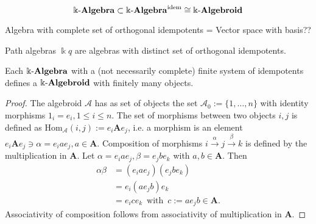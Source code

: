 \[
\Bbbk\textnormal{-}\mathbf{Algebra} \subset \Bbbk\textnormal{-}\mathbf{Algebra}^{\text{idem}} \cong \Bbbk\textnormal{-}\mathbf{Algebroid}
\]

Algebra with complete set of orthogonal idempotents = Vector space with basis??

Path algebras $\Bbbk q$ are algebras with distinct set of orthogonal idempotents.

\begin{proposition}
Each $\Bbbk\textnormal{-}\mathbf{Algebra}$ with a (not necessarily complete) finite system of idempotents defines a
$\Bbbk\textnormal{-}\mathbf{Algebroid}$ with finitely many objects.
\end{proposition}
\begin{proof}
The algebroid $\mathcal{A}$ has as set of objects the set $\mathcal{A}_{0} := \{1,\dots,n\}$ with identity morphisms
$1_{i} = e_{i}, 1\leq i \leq n$. The set of morphisms between two objects $i,j$ is defined as
$\mathrm{Hom}_{\mathcal{A}}(i,j) := e_{i}\mathbf{A}e_{j}$, i.e. a morphism is an element
$e_{i}\mathbf{A}e_{j} \ni \alpha = e_{i}ae_{j}, a\in \mathbf{A}$. Composition of morphisms
$i \xrightarrow{\alpha} j \xrightarrow{\beta} k$ is defined by the multiplication in $\mathbf{A}$.
Let $\alpha = e_{i}ae_{j}, \beta = e_{j}be_{k}$ with $a, b\in \mathbf{A}$. Then
\begin{align}
\alpha \beta &= (e_{i}ae_{j})(e_{j}be_{k}) \\
&= e_{i}(ae_{j}b)e_{k} \\
&= e_{i}ce_{k}\,\text{ with }\, c := ae_{j}b \in \mathbf{A}.
\end{align}
Associativity of composition follows from associativity of multiplication in $\mathbf{A}$.
\end{proof}

